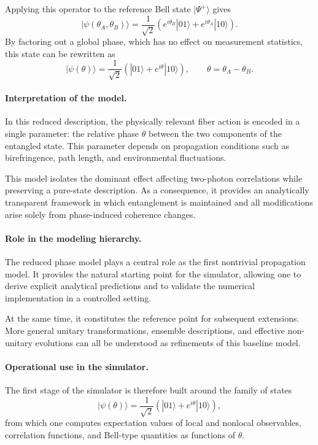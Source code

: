 \documentclass[a4paper]{article}
\begin{document}
Applying this operator to the reference Bell state \( |\Psi^+\rangle \) gives
\[
|\psi(\theta_A,\theta_B)\rangle
=
\frac{1}{\sqrt{2}}
\left(
e^{i\theta_B}|01\rangle
+
e^{i\theta_A}|10\rangle
\right).
\]
By factoring out a global phase, which has no effect on measurement statistics, this state can be rewritten as
\[
|\psi(\theta)\rangle
=
\frac{1}{\sqrt{2}}
\left(
|01\rangle
+
e^{i\theta}|10\rangle
\right),
\qquad
\theta = \theta_A - \theta_B.
\]

\paragraph{Interpretation of the model.}
In this reduced description, the physically relevant fiber action is encoded in a single parameter: the relative phase \(\theta\) between the two components of the entangled state. This parameter depends on propagation conditions such as birefringence, path length, and environmental fluctuations.

This model isolates the dominant effect affecting two-photon correlations while preserving a pure-state description. As a consequence, it provides an analytically transparent framework in which entanglement is maintained and all modifications arise solely from phase-induced coherence changes.

\paragraph{Role in the modeling hierarchy.}
The reduced phase model plays a central role as the first nontrivial propagation model. It provides the natural starting point for the simulator, allowing one to derive explicit analytical predictions and to validate the numerical implementation in a controlled setting.

At the same time, it constitutes the reference point for subsequent extensions. More general unitary transformations, ensemble descriptions, and effective non-unitary evolutions can all be understood as refinements of this baseline model.

\paragraph{Operational use in the simulator.}
The first stage of the simulator is therefore built around the family of states
\[
|\psi(\theta)\rangle
=
\frac{1}{\sqrt{2}}
\left(
|01\rangle + e^{i\theta}|10\rangle
\right),
\]
from which one computes expectation values of local and nonlocal observables, correlation functions, and Bell-type quantities as functions of \(\theta\).
\end{document}
